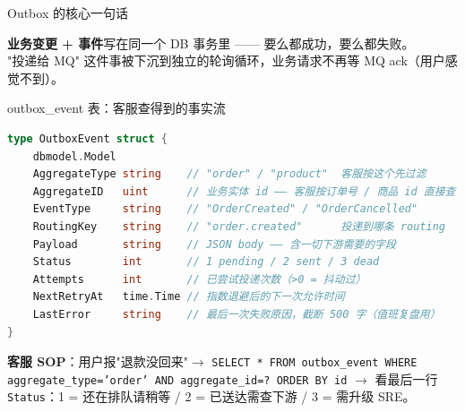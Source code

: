 \documentclass[aspectratio=169,11pt]{beamer}
\begin{document}
\begin{frame}[shrink]{Outbox 的核心一句话}
\vspace{2mm}
\small \textbf{业务变更 + 事件}写在同一个 DB 事务里 —— 要么都成功，要么都失败。 \\
"投递给 MQ" 这件事被下沉到独立的轮询循环，业务请求不再等 MQ ack（用户感觉不到）。
\end{frame}

\begin{frame}{outbox\_event 表：客服查得到的事实流}
\begin{lstlisting}[language=Go,firstnumber=25,
  caption={}]
type OutboxEvent struct {
    dbmodel.Model
    AggregateType string    // "order" / "product"  客服按这个先过滤
    AggregateID   uint      // 业务实体 id —— 客服按订单号 / 商品 id 直接查
    EventType     string    // "OrderCreated" / "OrderCancelled"
    RoutingKey    string    // "order.created"      投递到哪条 routing
    Payload       string    // JSON body —— 含一切下游需要的字段
    Status        int       // 1 pending / 2 sent / 3 dead
    Attempts      int       // 已尝试投递次数（>0 = 抖动过）
    NextRetryAt   time.Time // 指数退避后的下一次允许时间
    LastError     string    // 最后一次失败原因，截断 500 字（值班复盘用）
}
\end{lstlisting}
\vspace{1mm}
\small \textbf{客服 SOP}：用户报"退款没回来"$\to$ \texttt{SELECT * FROM outbox\_event WHERE aggregate\_type='order' AND aggregate\_id=? ORDER BY id} $\to$ 看最后一行 \texttt{Status}：1 = 还在排队请稍等 / 2 = 已送达需查下游 / 3 = 需升级 SRE。
\end{frame}
\end{document}
